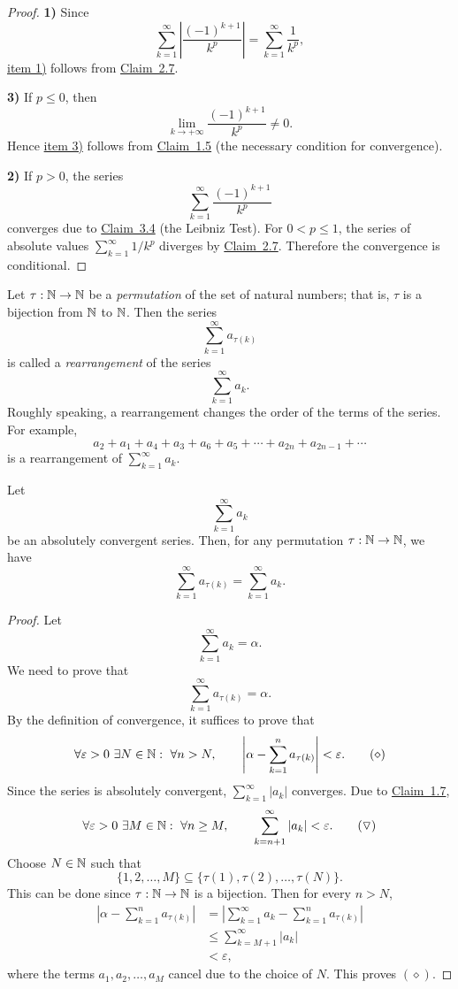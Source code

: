 \begin{proof}
\textbf{1)} Since
\[
\sum_{k=1}^{\infty}\left|\frac{(-1)^{k+1}}{k^p}\right|
=\sum_{k=1}^{\infty}\frac1{k^p},
\]
\hyperref[item:claim:3.8:1]{item 1)} follows from \hyperref[claim:2.7]{Claim~2.7}.

\medskip
\noindent\textbf{3)} If $p\le0$, then
\[
\lim_{k\to+\infty}\frac{(-1)^{k+1}}{k^p}\ne0.
\]
Hence \hyperref[item:claim:3.8:3]{item 3)} follows from \hyperref[claim:1.5]{Claim~1.5} (the necessary condition for convergence).

\medskip
\noindent\textbf{2)} If $p>0$, the series
\[
\sum_{k=1}^{\infty}\frac{(-1)^{k+1}}{k^p}
\]
converges due to \hyperref[claim:3.4]{Claim~3.4} (the Leibniz Test). For $0<p\le1$, the series of absolute values $\sum_{k=1}^{\infty}1/k^p$ diverges by \hyperref[claim:2.7]{Claim~2.7}. Therefore the convergence is conditional.
\end{proof}

\begin{definition}\label{def:3.2}
Let $\tau:\mathbb{N}\to\mathbb{N}$ be a \emph{permutation} of the set of natural numbers; that is, $\tau$ is a bijection from $\mathbb{N}$ to $\mathbb{N}$. Then the series
\[
\sum_{k=1}^{\infty}a_{\tau(k)}
\]
is called a \emph{rearrangement} of the series
\[
\sum_{k=1}^{\infty}a_k.
\]
Roughly speaking, a rearrangement changes the order of the terms of the series. For example,
\[
a_2+a_1+a_4+a_3+a_6+a_5+\cdots+a_{2n}+a_{2n-1}+\cdots
\]
is a rearrangement of $\sum_{k=1}^{\infty}a_k$.
\end{definition}

\begin{claim}\label{claim:3.9}
Let
\[
\sum_{k=1}^{\infty}a_k
\]
be an absolutely convergent series. Then, for any permutation $\tau:\mathbb{N}\to\mathbb{N}$, we have
\[
\sum_{k=1}^{\infty}a_{\tau(k)}
=\sum_{k=1}^{\infty}a_k.
\]
\end{claim}

\begin{proof}
Let
\[
\sum_{k=1}^{\infty}a_k=\alpha.
\]
We need to prove that
\[
\sum_{k=1}^{\infty}a_{\tau(k)}=\alpha.
\]
By the definition of convergence, it suffices to prove that
\[
\forall\varepsilon>0\ \exists N\in\mathbb{N}:\ \forall n>N,
\qquad
\left|\alpha-\sum_{k=1}^{n}a_{\tau(k)}\right|<\varepsilon.
\tag{$\diamond$}\label{eq:3:diamond:1}
\]
Since the series is absolutely convergent, $\sum_{k=1}^{\infty}|a_k|$ converges. Due to \hyperref[claim:1.7]{Claim~1.7},
\[
\forall\varepsilon>0\ \exists M\in\mathbb{N}:\ \forall n\ge M,
\qquad
\sum_{k=n+1}^{\infty}|a_k|<\varepsilon.
\tag{$\triangledown$}\label{eq:3:triangledown:1}
\]
Choose $N\in\mathbb{N}$ such that
\[
\{1,2,\ldots,M\}\subseteq\{\tau(1),\tau(2),\ldots,\tau(N)\}.
\]
This can be done since $\tau:\mathbb{N}\to\mathbb{N}$ is a bijection. Then for every $n>N$,
\begin{align*}
\left|\alpha-\sum_{k=1}^{n}a_{\tau(k)}\right|
&=\left|\sum_{k=1}^{\infty}a_k-\sum_{k=1}^{n}a_{\tau(k)}\right|\\
&\le\sum_{k=M+1}^{\infty}|a_k|\\
&<\varepsilon,
\end{align*}
where the terms $a_1,a_2,\ldots,a_M$ cancel due to the choice of $N$. This proves \hyperref[eq:3:diamond:1]{$(\diamond)$}.
\end{proof}

